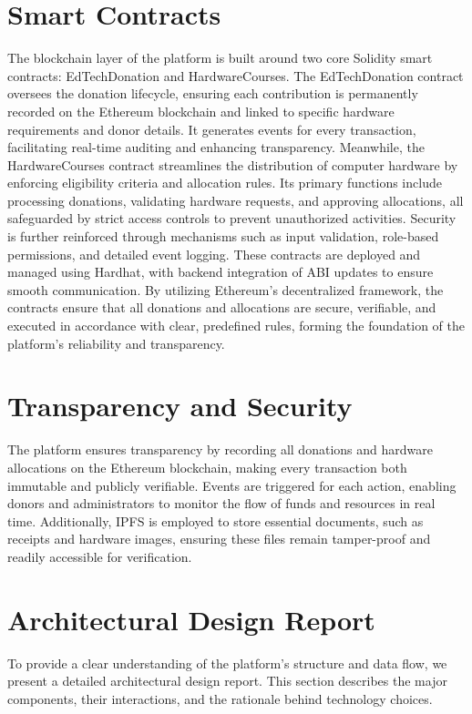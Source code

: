 \documentclass[a4paper,12pt]{report}
\begin{document}
\section{Smart Contracts}
The blockchain layer of the platform is built around two core Solidity smart contracts: EdTechDonation and HardwareCourses. The EdTechDonation contract oversees the donation lifecycle, ensuring each contribution is permanently recorded on the Ethereum blockchain and linked to specific hardware requirements and donor details. It generates events for every transaction, facilitating real-time auditing and enhancing transparency. Meanwhile, the HardwareCourses contract streamlines the distribution of computer hardware by enforcing eligibility criteria and allocation rules. Its primary functions include processing donations, validating hardware requests, and approving allocations, all safeguarded by strict access controls to prevent unauthorized activities. Security is further reinforced through mechanisms such as input validation, role-based permissions, and detailed event logging. These contracts are deployed and managed using Hardhat, with backend integration of ABI updates to ensure smooth communication. By utilizing Ethereum’s decentralized framework, the contracts ensure that all donations and allocations are secure, verifiable, and executed in accordance with clear, predefined rules, forming the foundation of the platform’s reliability and transparency.

\section{Transparency and Security}
The platform ensures transparency by recording all donations and hardware allocations on the Ethereum blockchain, making every transaction both immutable and publicly verifiable. Events are triggered for each action, enabling donors and administrators to monitor the flow of funds and resources in real time. Additionally, IPFS is employed to store essential documents, such as receipts and hardware images, ensuring these files remain tamper-proof and readily accessible for verification.

\section{Architectural Design Report}
To provide a clear understanding of the platform’s structure and data flow, we present a detailed architectural design report. This section describes the major components, their interactions, and the rationale behind technology choices.
\end{document}
